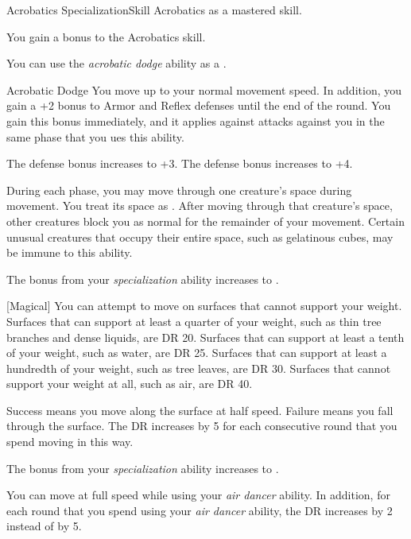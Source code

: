     \begin{feat}{Acrobatics Specialization}{Skill}
        \featpre Acrobatics as a mastered skill.

         You gain a  bonus to the Acrobatics skill.

         You can use the \textit{acrobatic dodge} ability as a .
        \begin{freeability}{Acrobatic Dodge}
            You move up to your normal movement speed.
            In addition, you gain a +2 bonus to Armor and Reflex defenses until the end of the round.
            You gain this bonus immediately, and it applies against attacks against you in the same phase that you ues this ability.

            \rankline
             The defense bonus increases to +3.
             The defense bonus increases to +4.
        \end{freeability}

         During each phase, you may move through one creature's space during movement.
        You treat its space as .
        After moving through that creature's space, other creatures block you as normal for the remainder of your movement.
        Certain unusual creatures that occupy their entire space, such as gelatinous cubes, may be immune to this ability.

         The bonus from your \textit{specialization} ability increases to .

        [Magical] You can attempt to move on surfaces that cannot support your weight.
        Surfaces that can support at least a quarter of your weight, such as thin tree branches and dense liquids, are DR 20.
        Surfaces that can support at least a tenth of your weight, such as water, are DR 25.
        Surfaces that can support at least a hundredth of your weight, such as tree leaves, are DR 30.
        Surfaces that cannot support your weight at all, such as air, are DR 40.

        Success means you move along the surface at half speed.
        Failure means you fall through the surface.
        The DR increases by 5 for each consecutive round that you spend moving in this way.

         The bonus from your \textit{specialization} ability increases to .

         You can move at full speed while using your \textit{air dancer} ability.
        In addition, for each round that you spend using your \textit{air dancer} ability, the DR increases by 2 instead of by 5.
    \end{feat}

